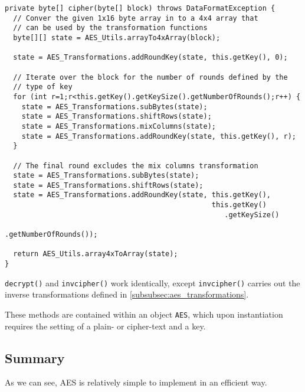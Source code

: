     \begin{lstlisting}
private byte[] cipher(byte[] block) throws DataFormatException {
  // Conver the given 1x16 byte array in to a 4x4 array that
  // can be used by the transformation functions
  byte[][] state = AES_Utils.arrayTo4xArray(block);
  
  state = AES_Transformations.addRoundKey(state, this.getKey(), 0);
  
  // Iterate over the block for the number of rounds defined by the 
  // type of key
  for (int r=1;r<this.getKey().getKeySize().getNumberOfRounds();r++) {
    state = AES_Transformations.subBytes(state);
    state = AES_Transformations.shiftRows(state);
    state = AES_Transformations.mixColumns(state);
    state = AES_Transformations.addRoundKey(state, this.getKey(), r);
  }
  
  // The final round excludes the mix columns transformation
  state = AES_Transformations.subBytes(state);
  state = AES_Transformations.shiftRows(state);
  state = AES_Transformations.addRoundKey(state, this.getKey(),
                                                 this.getKey()
                                                    .getKeySize()
                                                    .getNumberOfRounds());
  
  return AES_Utils.array4xToArray(state);
}
\end{lstlisting}

  \verb!decrypt()! and \verb!invcipher()! work identically, except \verb!invcipher()! carries out the inverse transformations defined in \textsection\ref{subsubsec:aes_transformations}.
  
  These methods are contained within an object \verb!AES!, which upon instantiation requires the setting of a plain- or cipher-text and a key.
  \subsection{Summary}
  
  As we can see, AES is relatively simple to implement in an efficient way. 